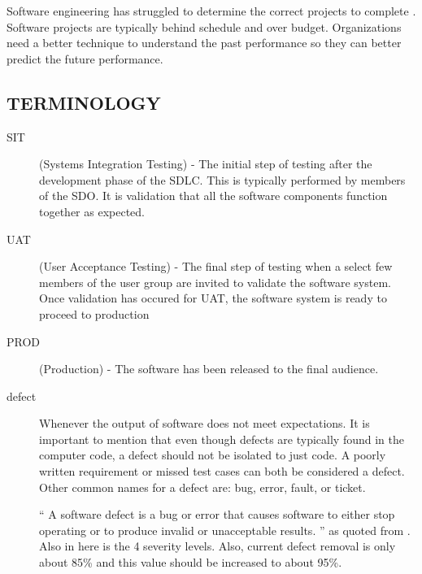 \documentclass[SDSUThesis.tex]{subfiles}
\begin{document}
    
    Software engineering has struggled to determine the correct projects to complete \cite{DeMarco2009}.
    Software projects are typically behind schedule and over budget. Organizations need a better
    technique to understand the past performance so they can better predict the future performance.

\subsection{TERMINOLOGY}

\begin{description}
    \item[SIT]   (Systems Integration Testing) - The initial step of testing
        after the development phase of the SDLC.  This is typically 
        performed by members of the SDO.  It is validation that all the
        software components function together as expected.
    \item[UAT]   (User Acceptance Testing) - The final step of testing
        when a select few members of the user group are invited to
        validate the software system. Once validation has occured for
        UAT, the software system is ready to proceed to production
    \item[PROD]  (Production) - The software has been released to the final audience.
    \item[defect] Whenever the output of software does not meet expectations.  It is important to mention that even though defects are typically 
            found in the computer code, a defect should not be isolated to just code.   A poorly written requirement or missed test cases can 
            both be considered a defect.  Other common names for a defect are: bug, error, fault, or ticket.
            
            ``
                A software defect is a bug or error that causes
                software to either stop operating or to produce
                invalid or unacceptable results.
            '' as quoted from
            \cite{Jones2009}.  Also in here is the 4 severity levels.  Also, current defect removal is only about 85\% and this value should be increased to about 95\%. 
\end{description}


\end{document}
